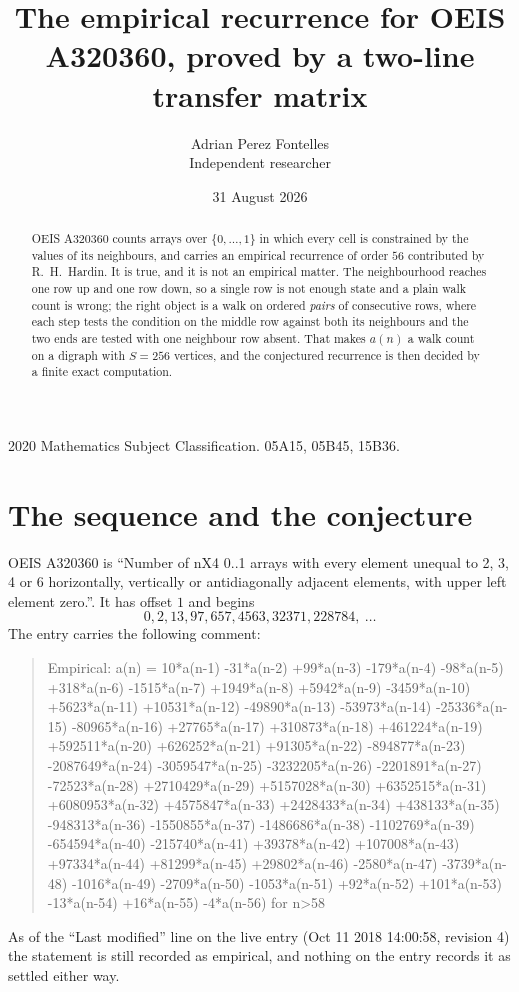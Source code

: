 \documentclass[11pt,a4paper]{article}
\title{The empirical recurrence for OEIS A320360, proved by a two-line transfer matrix}
\author{Adrian Perez Fontelles\\ \small Independent researcher}
\date{31 August 2026}
\theoremstyle{plain}
\theoremstyle{definition}
\begin{document}
\maketitle

\begin{abstract}
OEIS A320360 counts arrays over $\{0,\dots,1\}$ in which every cell is constrained by the
values of its neighbours, and carries an empirical recurrence of order $56$ contributed
by R.~H.~Hardin. It is true, and it is not an empirical matter. The neighbourhood reaches one
row up and one row down, so a single row is not enough state and a plain walk count
is wrong; the right object is a walk on ordered \emph{pairs} of consecutive rows, where
each step tests the condition on the middle row against both its neighbours and the two
ends are tested with one neighbour row absent. That makes $a(n)$ a walk count on a digraph
with $S=256$ vertices, and the conjectured recurrence is then decided by a finite exact
computation.
\end{abstract}

\noindent\small 2020 Mathematics Subject Classification. 05A15, 05B45, 15B36.\normalsize

\section{The sequence and the conjecture}

OEIS A320360 is ``Number of nX4 0..1 arrays with every element unequal to 2, 3, 4 or 6 horizontally, vertically or antidiagonally adjacent elements, with upper left element zero.''. It has offset $1$ and begins
\[
0, 2, 13, 97, 657, 4563, 32371, 228784,\ \dots
\]
The entry carries the following comment:
\begin{quote}\small
Empirical: a(n) = 10*a(n-1) -31*a(n-2) +99*a(n-3) -179*a(n-4) -98*a(n-5) +318*a(n-6) -1515*a(n-7) +1949*a(n-8) +5942*a(n-9) -3459*a(n-10) +5623*a(n-11) +10531*a(n-12) -49890*a(n-13) -53973*a(n-14) -25336*a(n-15) -80965*a(n-16) +27765*a(n-17) +310873*a(n-18) +461224*a(n-19) +592511*a(n-20) +626252*a(n-21) +91305*a(n-22) -894877*a(n-23) -2087649*a(n-24) -3059547*a(n-25) -3232205*a(n-26) -2201891*a(n-27) -72523*a(n-28) +2710429*a(n-29) +5157028*a(n-30) +6352515*a(n-31) +6080953*a(n-32) +4575847*a(n-33) +2428433*a(n-34) +438133*a(n-35) -948313*a(n-36) -1550855*a(n-37) -1486686*a(n-38) -1102769*a(n-39) -654594*a(n-40) -215740*a(n-41) +39378*a(n-42) +107008*a(n-43) +97334*a(n-44) +81299*a(n-45) +29802*a(n-46) -2580*a(n-47) -3739*a(n-48) -1016*a(n-49) -2709*a(n-50) -1053*a(n-51) +92*a(n-52) +101*a(n-53) -13*a(n-54) +16*a(n-55) -4*a(n-56) for n>58
\end{quote}
As of the ``Last modified'' line on the live entry (Oct 11 2018 14:00:58, revision 4) the statement is
still recorded as empirical, and nothing on the entry records it as settled either way.
\end{document}
